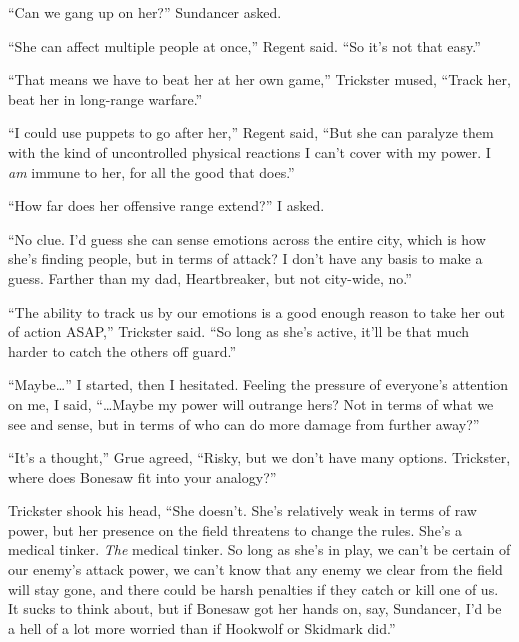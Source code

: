 ``Can we gang up on her?'' Sundancer asked.



``She can affect multiple people at once,'' Regent said.  ``So it's not that easy.''



``That means we have to beat her at her own game,'' Trickster mused, ``Track her, beat her in long-range warfare.''



``I could use puppets to go after her,'' Regent said, ``But she can paralyze them with the kind of uncontrolled physical reactions I can't cover with my power.  I \emph{am} immune to her, for all the good that does.''



``How far does her offensive range extend?'' I asked.



``No clue.  I'd guess she can sense emotions across the entire city, which is how she's finding people, but in terms of attack? I don't have any basis to make a guess.  Farther than my dad, Heartbreaker, but not city-wide, no.''



``The ability to track us by our emotions is a good enough reason to take her out of action ASAP,'' Trickster said.  ``So long as she's active, it'll be that much harder to catch the others off guard.''



``Maybe\ldots'' I started, then I hesitated.  Feeling the pressure of everyone's attention on me, I said, ``\ldots{}Maybe my power will outrange hers?  Not in terms of what we see and sense, but in terms of who can do more damage from further away?''



``It's a thought,'' Grue agreed, ``Risky, but we don't have many options.  Trickster, where does Bonesaw fit into your analogy?''



Trickster shook his head, ``She doesn't.  She's relatively weak in terms of raw power, but her presence on the field threatens to change the rules.  She's a medical tinker.  \emph{The} medical tinker.  So long as she's in play, we can't be certain of our enemy's attack power, we can't know that any enemy we clear from the field will stay gone, and there could be harsh penalties if they catch or kill one of us.  It sucks to think about, but if Bonesaw got her hands on, say, Sundancer, I'd be a hell of a lot more worried than if Hookwolf or Skidmark did.''




